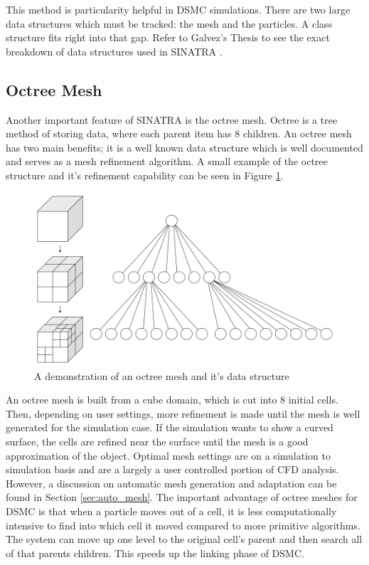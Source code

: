 \indent This method is particularity helpful in DSMC simulations. There are two large data structures which must be tracked: the mesh and the particles. A class structure fits right into that gap. Refer to Galvez's Thesis to see the exact breakdown of data structures used in SINATRA \cite{Galvez2018a}. \par

\subsection{Octree Mesh}
\label{sec:octree}

Another important feature of SINATRA is the octree mesh. Octree is a tree method of storing data, where each parent item has 8 children. An octree mesh has two main benefits; it is a well known data structure which is well documented and serves as a mesh refinement algorithm. A small example of the octree structure and it's refinement capability can be seen in Figure \ref{fig:octree}. \par


\begin{figure}
    \centering
    \includegraphics[width=.7\textwidth]{figures/octree.png}
    \caption[A demonstration of an octree mesh and it's data structure]{A demonstration of an octree mesh and it's data structure  \cite{octree}}
    \label{fig:octree}
\end{figure}


\indent An octree mesh is built from a cube domain, which is cut into 8 initial cells. Then, depending on user settings, more refinement is made until the mesh is well generated for the simulation case. If the simulation wants to show a curved surface, the cells are refined near the surface until the mesh is a good approximation of the object. Optimal mesh settings are on a simulation to simulation basis and are a largely a user controlled portion of CFD analysis. However, a discussion on automatic mesh generation and adaptation can be found in Section \ref{sec:auto_mesh}. The important advantage of octree meshes for DSMC is that when a particle moves out of a cell, it is less computationally intensive to find into which cell it moved compared to more primitive algorithms. The system can move up one level to the original cell's parent and then search all of that parents children. This speeds up the linking phase of DSMC. \par



